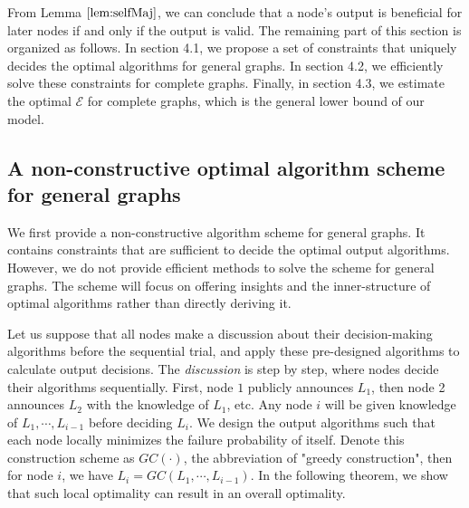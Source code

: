 \documentclass[a4paper,UKenglish]{lipics}
\theoremstyle{definition}
\begin{document}
From Lemma $\ref{lem:selfMaj}$, we can conclude that a node's output is beneficial for later nodes if and only if the output is valid.
The remaining part of this section is organized as follows.
In section 4.1, we propose a set of constraints that uniquely decides the optimal algorithms for general graphs. 
In section 4.2, we efficiently solve these constraints for complete graphs. 
Finally, in section 4.3, we estimate the optimal $\mathcal{E}$ for complete graphs, which is the general lower bound of our model.


\subsection{A non-constructive optimal algorithm scheme for general graphs}
\label{Construction}
We first provide a non-constructive algorithm scheme for general graphs.
It contains constraints that are sufficient to decide the optimal output algorithms.
However, we do not provide efficient methods to solve the scheme for general graphs.
The scheme will focus on offering insights and the inner-structure of optimal algorithms rather than directly deriving it.

Let us suppose that all nodes make a discussion about their decision-making algorithms before the sequential trial, and apply these pre-designed algorithms to calculate output decisions.
The \emph{discussion} is step by step, where nodes decide their algorithms sequentially.
First, node $1$ publicly announces $L_1$, then node 2 announces $L_2$ with the knowledge of $L_1$, etc. 
Any node $i$ will be given knowledge of $L_1, \dotsb, L_{i-1}$ before deciding $L_i$.
We design the output algorithms such that each node locally minimizes the failure probability of itself.
Denote this construction scheme as $GC(\cdot)$, the abbreviation of "greedy construction",
	then for node $i$, we have $L_i = GC(L_1,\dotsb,L_{i-1})$.
In the following theorem, we show that such local optimality can result in an overall optimality.
\end{document}
